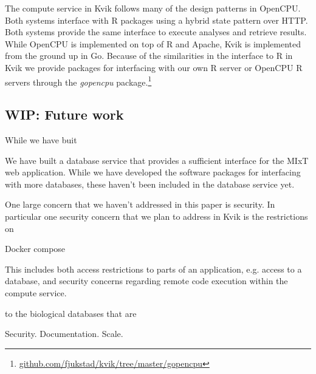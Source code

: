 
The compute service in Kvik follows many of the design patterns in
OpenCPU. Both systems interface with R packages using a hybrid state pattern
over HTTP. Both systems provide the same interface to execute analyses and
retrieve results.  While OpenCPU is implemented on top of R and Apache, Kvik is
implemented from the ground up in Go. Because of the similarities in the
interface to R in Kvik we provide packages for interfacing with our own R server
or OpenCPU R servers through the
\emph{gopencpu} package.\footnote{\url{github.com/fjukstad/kvik/tree/master/gopencpu}} 


\subsection*{WIP: Future work} 
While we have buit 

We have built a database service that provides a sufficient interface for the
MIxT web application. While we have developed the software packages for
interfacing with more databases, these haven't been included in the database
service yet. 

One large concern that we haven't addressed in this paper is security. In
particular one security concern that we plan to address in Kvik is the
restrictions on 

Docker compose 

This
includes both access restrictions to parts of an application, e.g. access to a
database, and security concerns regarding remote code execution within the
compute service. 

to the 
biological databases that are 

Security.
Documentation.
Scale. 
